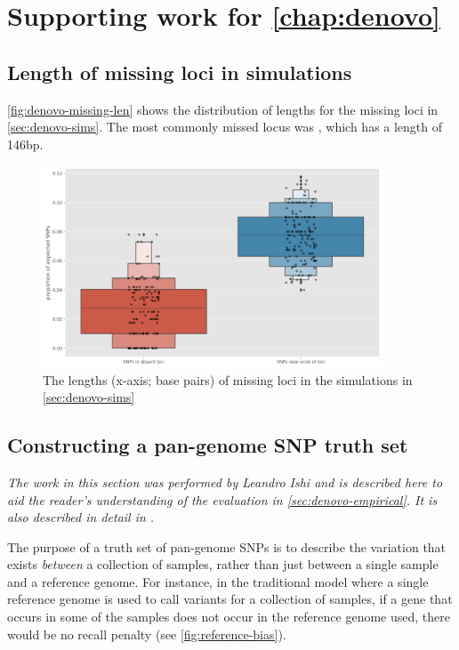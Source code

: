 \chapter{Supporting work for \autoref*{chap:denovo}}

\section{Length of missing loci in simulations}
\label{app:denovo-missing-lengths}

\autoref{fig:denovo-missing-len} shows the distribution of lengths for the missing loci in \autoref{sec:denovo-sims}. The most commonly missed locus was , which has a length of 146bp.

\begin{figure}
    \centering
    \includegraphics[width=0.9\textwidth]{Chapter1/Figs/denovo_errors.png}
    \caption{The lengths (x-axis; base pairs) of missing loci in the \denovo{} simulations in \autoref{sec:denovo-sims}}
    \label{fig:denovo-missing-len}
\end{figure}

\section{Constructing a pan-genome SNP truth set}
\label{app:pangenome-snp-truth}

\textit{The work in this section was performed by Leandro Ishi and is described here to aid the reader's understanding of the evaluation in \autoref{sec:denovo-empirical}. It is also described in detail in \cite{pandora}.}

The purpose of a truth set of pan-genome SNPs is to describe the variation that exists \emph{between} a collection of samples, rather than just between a single sample and a reference genome. For instance, in the traditional model where a single reference genome is used to call variants for a collection of samples, if a gene that occurs in some of the samples does not occur in the reference genome used, there would be no recall penalty (see \autoref{fig:reference-bias}).

